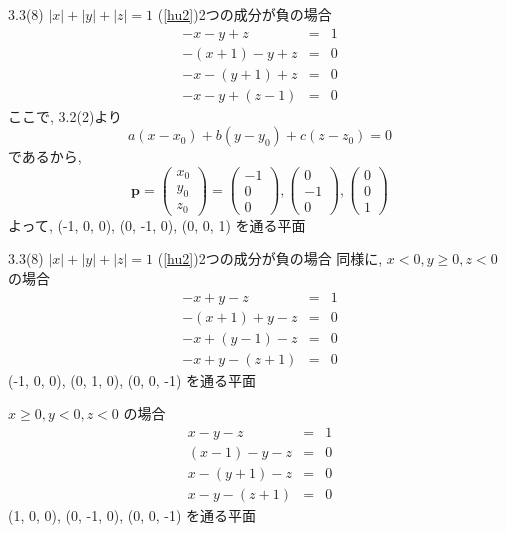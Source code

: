 \documentclass{beamer}
\begin{document}
\begin{frame}{3.3(8) $|x| + |y| + |z|  = 1$ \hspace{5mm} (\ref{hu2})2つの成分が負の場合}
  \begin{eqnarray*}
    -x - y + z &=& 1\\
    -(x+1) - y + z &=& 0\\
    -x - (y+1) + z &=& 0\\
    -x - y + (z-1) &=& 0
  \end{eqnarray*}
  ここで, 3.2(2)より
  \begin{equation*}
    a(x-x_0) + b(y-y_0) + c(z-z_0) = 0
  \end{equation*}
  であるから,
  \begin{equation*}
    \bm{p} = 
    \begin{pmatrix}
      x_0\\
      y_0\\
      z_0
    \end{pmatrix} =
    \begin{pmatrix}
      -1\\
      0\\
      0
    \end{pmatrix} , 
    \begin{pmatrix}
      0\\
      -1\\
      0
    \end{pmatrix} , 
    \begin{pmatrix}
      0\\
      0\\
      1
    \end{pmatrix} 
  \end{equation*}
  よって, (-1, 0, 0), (0, -1, 0), (0, 0, 1) を通る平面
\end{frame}



\begin{frame}{3.3(8) $|x| + |y| + |z|  = 1$ \hspace{5mm} (\ref{hu2})2つの成分が負の場合}
  同様に, $x < 0, y \geq 0, z < 0$ の場合 
  \begin{eqnarray*}
    -x + y -z &=& 1\\
    -(x+1) + y - z &=& 0\\
    -x + (y-1) - z &=& 0\\
    -x + y - (z+1) &=& 0
  \end{eqnarray*}
  (-1, 0, 0), (0, 1, 0), (0, 0, -1) を通る平面 \\ \vspace{5mm}

  $x \geq 0, y < 0, z < 0$ の場合 
  \begin{eqnarray*}
    x - y - z &=& 1\\
    (x-1) - y - z &=& 0\\
    x - (y+1) - z &=& 0\\
    x - y - (z+1) &=& 0
  \end{eqnarray*}
  (1, 0, 0), (0, -1, 0), (0, 0, -1) を通る平面
\end{frame}
\end{document}
